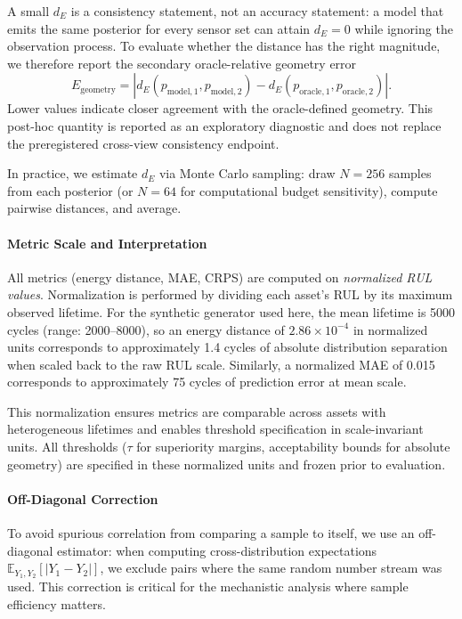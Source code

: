 A small $d_E$ is a consistency statement, not an accuracy statement: a model
that emits the same posterior for every sensor set can attain $d_E=0$ while
ignoring the observation process. To evaluate whether the distance has the
right magnitude, we therefore report the secondary oracle-relative geometry
error
\[
E_{\mathrm{geometry}} = \left|d_E(p_{\mathrm{model},1},p_{\mathrm{model},2}) - d_E(p_{\mathrm{oracle},1},p_{\mathrm{oracle},2})\right|.
\]
Lower values indicate closer agreement with the oracle-defined geometry. This
post-hoc quantity is reported as an exploratory diagnostic and does not replace
the preregistered cross-view consistency endpoint.

In practice, we estimate $d_E$ via Monte Carlo sampling: draw $N=256$ samples from each posterior (or $N=64$ for computational budget sensitivity), compute pairwise distances, and average.

\paragraph{Metric Scale and Interpretation}
All metrics (energy distance, MAE, CRPS) are computed on \emph{normalized RUL values}. Normalization is performed by dividing each asset's RUL by its maximum observed lifetime. For the synthetic generator used here, the mean lifetime is 5000 cycles (range: 2000--8000), so an energy distance of $2.86 \times 10^{-4}$ in normalized units corresponds to approximately 1.4 cycles of absolute distribution separation when scaled back to the raw RUL scale. Similarly, a normalized MAE of 0.015 corresponds to approximately 75 cycles of prediction error at mean scale.

This normalization ensures metrics are comparable across assets with heterogeneous lifetimes and enables threshold specification in scale-invariant units. All thresholds ($\tau$ for superiority margins, acceptability bounds for absolute geometry) are specified in these normalized units and frozen prior to evaluation.

\paragraph{Off-Diagonal Correction}
To avoid spurious correlation from comparing a sample to itself, we use an off-diagonal estimator: when computing cross-distribution expectations $\mathbb{E}_{Y_1, Y_2}[|Y_1 - Y_2|]$, we exclude pairs where the same random number stream was used. This correction is critical for the mechanistic analysis where sample efficiency matters.

